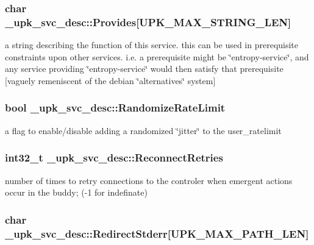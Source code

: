 \subsubsection{\setlength{\rightskip}{0pt plus 5cm}char \bf{\_\-upk\_\-svc\_\-desc::Provides}[UPK\_\-MAX\_\-STRING\_\-LEN]\hspace{0.3cm}{\tt  [inherited]}}\label{group__config__impl_g9bf2479c332ccb6af41f55b37a16dc54}


a string describing the function of this service. this can be used in prerequisite constraints upon other services. i.e. a prerequisite might be \char`\"{}entropy-service\char`\"{}, and any service providing \char`\"{}entropy-service\char`\"{} would then satisfy that prerequisite [vaguely remeniscent of the debian \char`\"{}alternatives\char`\"{} system] 
\subsubsection{\setlength{\rightskip}{0pt plus 5cm}bool \bf{\_\-upk\_\-svc\_\-desc::Randomize\-Rate\-Limit}\hspace{0.3cm}{\tt  [inherited]}}\label{group__config__impl_g672805f98a7805b68f6812bc19b7f059}


a flag to enable/disable adding a randomized \char`\"{}jitter\char`\"{} to the user\_\-ratelimit 
\subsubsection{\setlength{\rightskip}{0pt plus 5cm}int32\_\-t \bf{\_\-upk\_\-svc\_\-desc::Reconnect\-Retries}\hspace{0.3cm}{\tt  [inherited]}}\label{group__config__impl_gdb5b849cb271f65abadbf911885c7131}


number of times to retry connections to the controler when emergent actions occur in the buddy; (-1 for indefinate) 
\subsubsection{\setlength{\rightskip}{0pt plus 5cm}char \bf{\_\-upk\_\-svc\_\-desc::Redirect\-Stderr}[UPK\_\-MAX\_\-PATH\_\-LEN]\hspace{0.3cm}{\tt  [inherited]}}\label{group__config__impl_gb00914e4cb9ee41490a9bce4aab069f2}


